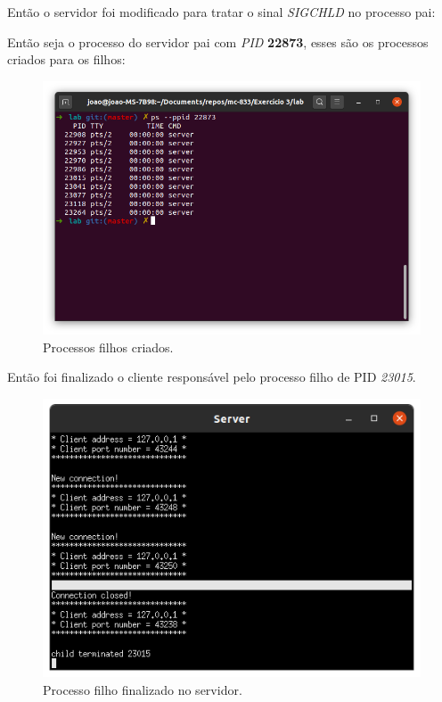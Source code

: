 \documentclass[12pt,a4paper]{report}
\begin{document}
\bigskip

Então o servidor foi modificado para tratar o sinal \emph{SIGCHLD} no processo pai:


Então seja o processo do servidor pai com \emph{PID} \textbf{22873}, esses são os processos criados para os filhos:
\begin{figure}[H]
  \includegraphics[width=\linewidth]{before.png}
  \caption{Processos filhos criados.}
\end{figure}

Então foi finalizado o cliente responsável pelo processo filho de PID \emph{23015}.

\begin{figure}[H]
  \includegraphics[width=\linewidth]{pa.png}
  \caption{Processo filho finalizado no servidor.}
\end{figure}
\end{document}
